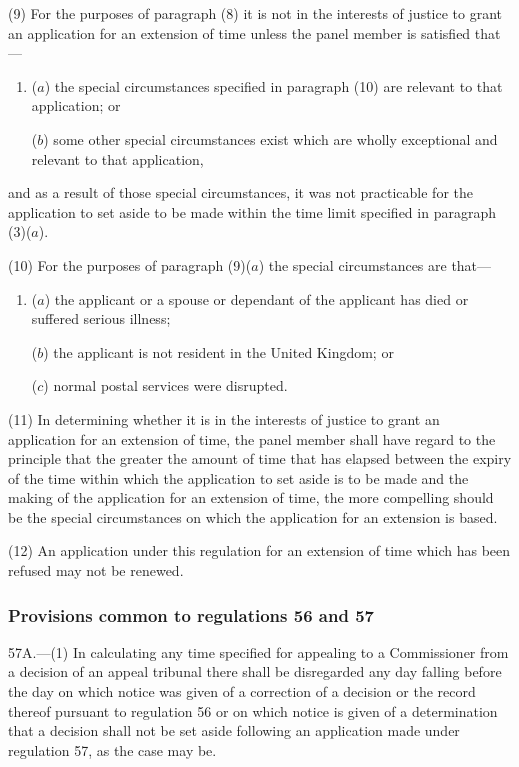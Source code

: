 \documentclass[12pt,a4paper]{article}
\begin{document}
(9) For the purposes of paragraph (8) it is not in the interests of justice to grant an application for an extension of time unless the panel member is satisfied that—
\begin{enumerate}\item[]
($a$) the special circumstances specified in paragraph (10) are relevant to that application; or

($b$) some other special circumstances exist which are wholly exceptional and relevant to that application,
\end{enumerate}
and as a result of those special circumstances, it was not practicable for the application to set aside to be made within the time limit specified in paragraph (3)($a$).

(10) For the purposes of paragraph (9)($a$)  the special circumstances are that—
\begin{enumerate}\item[]
($a$) the applicant or a spouse or dependant of the applicant has died or suffered serious illness;

($b$) the applicant is not resident in the United Kingdom; or

($c$) normal postal services were disrupted.
\end{enumerate}

(11) In determining whether it is in the interests of justice to grant an application for an extension of time, the panel member shall have regard to the principle that the greater the amount of time that has elapsed between the expiry of the time within which the application to set aside is to be made and the making of the application for an extension of time, the more compelling should be the special circumstances on which the application for an extension is based.

(12) An application under this regulation for an extension of time which has been refused may not be renewed.


\subsubsection[57A. Provisions common to regulations 56 and 57]{Provisions common to regulations 56 and 57}

57A.---(1)  In calculating any time specified for appealing to a Commissioner from a decision of an appeal tribunal there shall be disregarded any day falling before the day on which notice was given of a correction of a decision or the record thereof pursuant to regulation 56 or on which notice is given of a determination that a decision shall not be set aside following an application made under regulation 57, as the case may be.
\end{document}
